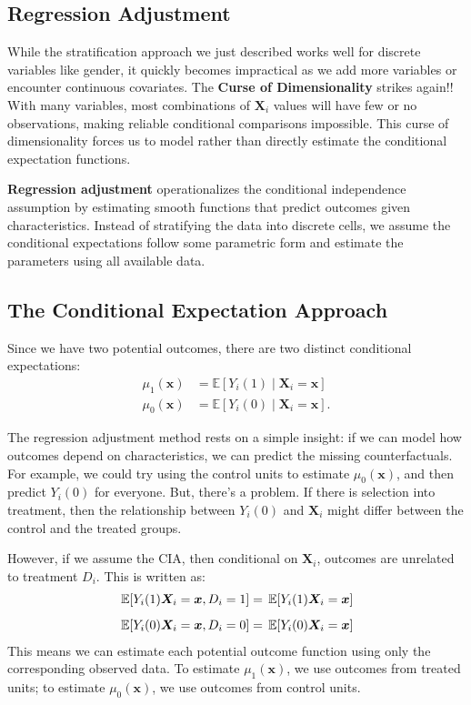 \documentclass[12pt]{article}
\begin{document}
\begin{multicols}{2}
\section*{Regression Adjustment}

While the stratification approach we just described works well for discrete variables like gender, it quickly becomes impractical as we add more variables or encounter continuous covariates.
The \textbf{Curse of Dimensionality} strikes again!!
With many variables, most combinations of $\bm{X}_i$ values will have few or no observations, making reliable conditional comparisons impossible.
This curse of dimensionality forces us to model rather than directly estimate the conditional expectation functions.

\textbf{Regression adjustment} operationalizes the conditional independence assumption by estimating smooth functions that predict outcomes given characteristics.
Instead of stratifying the data into discrete cells, we assume the conditional expectations follow some parametric form and estimate the parameters using all available data.

\subsection*{The Conditional Expectation Approach}

Since we have two potential outcomes, there are two distinct conditional expectations: 
\begin{align*}
  \mu_1(\bm{x}) &= \mathbb{E}[Y_i(1) \mid \bm{X}_i = \bm{x}] \\[0.5em]
  \mu_0(\bm{x}) &= \mathbb{E}[Y_i(0) \mid \bm{X}_i = \bm{x}].
\end{align*}

The regression adjustment method rests on a simple insight: if we can model how outcomes depend on characteristics, we can predict the missing counterfactuals.
For example, we could try using the control units to estimate $\mu_0(\bm{x})$, and then predict $Y_i(0)$ for everyone.
But, there's a problem. 
If there is selection into treatment, then the relationship between $Y_i(0)$ and $\bm{X}_i$ might differ between the control and the treated groups.

However, if we assume the CIA, then conditional on $\bm{X}_i$, outcomes are unrelated to treatment $D_i$.
This is written as:
\begin{align*}
  \expec{Y_i(1){\bm{X}_i = \bm{x}}, D_i = 1} &= \expec{Y_i(1){\bm{X}_i = \bm{x}}}  \\[0.5em]
  \expec{Y_i(0){\bm{X}_i = \bm{x}}, D_i = 0} &= \expec{Y_i(0){\bm{X}_i = \bm{x}}}  
\end{align*}
This means we can estimate each potential outcome function using only the corresponding observed data.
To estimate $\mu_1(\bm{x})$, we use outcomes from treated units; to estimate $\mu_0(\bm{x})$, we use outcomes from control units.


\end{multicols}
\end{document}
